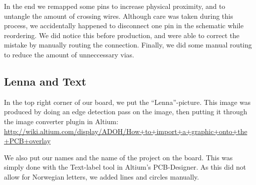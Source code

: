 In the end we remapped some pins to increase physical proximity, and to untangle
the amount of crossing wires. Although care was taken during this process, we
accidentally happened to disconnect one pin in the schematic while reordering.
We did notice this before production, and were able to correct the mistake by
manually routing the connection. Finally, we did some manual routing to reduce
the amount of unneccessary vias.

\subsection {Lenna and Text}
In the top right corner of our board, we put the ``Lenna''-picture. This image
was produced by doing an edge detection pass on the image, then putting it
through the image converter plugin in Altium:
\url{http://wiki.altium.com/display/ADOH/How+to+import+a+graphic+onto+the+PCB+overlay}

We also put our names and the name of the project on the board. This was simply
done with the Text-label tool in Altium's PCB-Designer. As this did not allow
for Norwegian letters, we added lines and circles manually.
